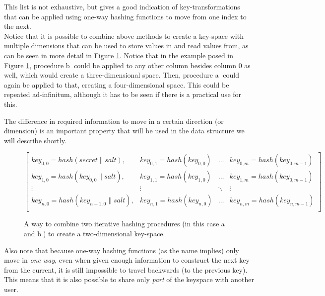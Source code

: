 \documentclass[a4paper]{article}
\begin{document}
This list is not exhaustive, but gives a good indication of key-transformations that can be applied using one-way hashing functions to move from one index to the next. \\


Notice that it is possible to combine above methods to create a key-space with multiple dimensions that can be used to store values in and read values from, as can be seen in more detail in Figure \ref{fig:combined_hashing_funcs}.  Notice that in the example posed in Figure \ref{fig:combined_hashing_funcs}, procedure \textcircled{b} could be applied to any other column besides column 0 as well, which would create a three-dimensional space. Then, procedure \textcircled{a} could again be applied to that, creating a four-dimensional space. This could be repeated ad-infinitum, although it has to be seen if there is a practical use for this. 


The difference in required information to move in a certain direction (or dimension) is an important property that will be used in the data structure we will describe shortly.


\begin{figure}

$$
\begin{bmatrix}
	key_{0,0} = hash(secret \parallel salt),      & key_{0,1} = hash(key_{0,0})  & \dots & key_{0,m} = hash(key_{0,m-1}) \\
	key_{1,0} = hash(key_{0,0} \parallel salt),   & key_{1,1} = hash(key_{1,0})  & \dots & key_{1,m} = hash(key_{0,m-1}) \\
	\vdots & \vdots & \ddots & \vdots \\
	key_{n,0} = hash(key_{n-1,0} \parallel salt), & key_{n,1} = hash(key_{n,0})  & \dots & key_{n,m} = hash(key_{n,m-1}) \\
\end{bmatrix}
$$

	\caption{
	\label{fig:combined_hashing_funcs}	
	A way to combine two iterative hashing procedures (in this case \textcircled{a} and \textcircled{b}) to create a two-dimensional key-space.
	}
\end{figure}

Also note that because one-way hashing functions (as the name implies) only move in \textit{one way}, even when given enough information to construct the next key from the current, it is still impossible to travel backwards (to the previous key). This means that it is also possible to share only \textit{part} of the keyspace with another user.\\
\end{document}
